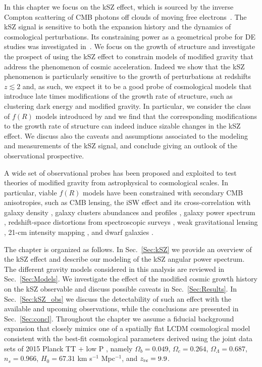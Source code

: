 In this chapter we focus on the kSZ effect, which is sourced by the inverse Compton scattering of \gls{CMB} photons off clouds of moving free electrons~\citep{Sunyaev1980,Vishniac1987, Jaffe1998,Shaw2012}. The kSZ signal is sensitive to both the expansion history and the dynamics of cosmological perturbations. Its constraining power as a geometrical probe for \gls{DE} studies was investigated in~\cite{Ma2014a}. We focus on the growth of structure and  investigate the prospect of using the kSZ effect to constrain models of modified gravity that address the phenomenon of cosmic acceleration. Indeed we show that the kSZ phenomenon is particularly sensitive to the growth of perturbations at redshifts $z\lesssim 2$ and, as such, we expect it to be a good probe of cosmological models that introduce late times modifications of the growth rate of structure, such as clustering dark energy and modified gravity. In particular,  we consider the class of $f(R)$ models introduced by \cite{Hu2007} and we find that the corresponding modifications to the growth rate of structure can indeed induce sizable changes in the kSZ effect. We  discuss also the caveats and assumptions associated to the modeling and measurements of the kSZ signal, and conclude giving an outlook of the observational prospective. 

A wide set of observational probes has been proposed and exploited to test theories of modified gravity from astrophysical to cosmological scales. In particular, viable $f(R)$ models have been constrained with secondary CMB anisotropies, such as CMB lensing, the \gls{iSW} effect \citep{Raveri2014,PlanckCollaboration2015a} and its cross-correlation with galaxy density \citep{Song2007a,Giannantonio2010}, galaxy clusters abundances \citep{Jain2008, Ferraro2011, Cataneo2015} and profiles \citep{Lombriser2012,Wilcox2015}, galaxy power spectrum \citep{Oyaizu2008,Dossett2014}, redshift-space distortions from spectroscopic surveys \citep{Guzzo2008,Yamamoto2010,Alam2015}, weak gravitational lensing \citep{Simpson2013, Harnois-Deraps2015}, 21-cm intensity mapping \citep{Hall2013}, and dwarf galaxies \citep{Jain2013,Vikram2013}.

 The chapter is organized as follows. In Sec.~\eqref{Sec:kSZ} we provide an overview of the kSZ effect and describe our modeling of the kSZ angular power spectrum. The different gravity models considered in this analysis are reviewed in Sec.~\eqref{Sec:Models}.  We investigate the effect of the modified cosmic growth history on the kSZ observable and discuss possible caveats in Sec.~\eqref{Sec:Results}. In Sec.~\eqref{Sec:kSZ_obs} we discuss the detectability of such an effect with the available and upcoming observations, while the conclusions are presented in Sec.~\eqref{Sec:concl}. Throughout the chapter we assume a fiducial background expansion that closely mimics one of a spatially flat \gls{LCDM} cosmological model consistent with the best-fit cosmological parameters derived using the joint data sets of 2015 Planck TT + low P \citep{PlanckCollaboration2015b}, namely $\Omega_b=0.049$, $\Omega_c=0.264$, $\Omega_{\Lambda}=0.687$, $n_s=0.966$, $H_0=67.31$ km s$^{-1}$ Mpc$^{-1}$, and $z_{\rm re}=9.9$.

